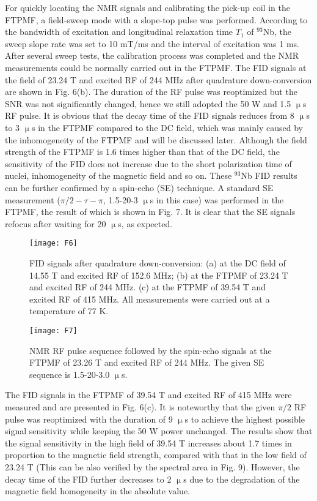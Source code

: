 \documentclass[lettersize,journal]{IEEEtran}
\begin{document}
For quickly locating the NMR signals and calibrating the pick-up coil in the FTPMF, a field-sweep mode with a slope-top pulse was performed. According to the bandwidth of excitation and longitudinal relaxation time $T_1$ of $^{93}$Nb, the sweep slope rate was set to 10 mT/ms and the interval of excitation was 1 ms. After several sweep tests, the calibration process was completed and the NMR measurements could be normally carried out in the FTPMF. The FID signals at the field of 23.24 T and excited RF of 244 MHz after quadrature down-conversion are shown in Fig. 6(b). The duration of the RF pulse was reoptimized but the SNR was not significantly changed, hence we still adopted the 50 W and 1.5 $\upmu$s RF pulse. It is obvious that the decay time of the FID signals reduces from 8 $\upmu$s to 3 $\upmu$s in the FTPMF compared to the DC field, which was mainly caused by the inhomogeneity of the FTPMF and will be discussed later. Although the field strength of the FTPMF is 1.6 times higher than that of the DC field, the sensitivity of the FID does not increase due to the short polarization time of nuclei, inhomogeneity of the magnetic field and so on. These $^{93}$Nb FID results can be further confirmed by a spin-echo (SE) technique. A standard SE measurement ($\pi /2-\tau -\pi$, 1.5-20-3 $\upmu$s in this case) was performed in the FTPMF, the result of which is shown in Fig. 7. It is clear that the SE signals refocus after waiting for 20 $\upmu$s, as expected.

\begin{figure}[t]
\centering
\texttt{[image: F6]}
\caption{FID signals after quadrature down-conversion: (a) at the DC field of 14.55 T and excited RF of 152.6 MHz; (b) at the FTPMF of 23.24 T and excited RF of 244 MHz. (c) at the FTPMF of 39.54 T and excited RF of 415 MHz. All measurements were carried out at a temperature of 77 K.}
\end{figure}

\begin{figure}[t]
\centering
\texttt{[image: F7]}
\caption{
NMR RF pulse sequence followed by the spin-echo signals at the FTPMF of 23.26 T and excited RF of 244 MHz. The given SE sequence is 1.5-20-3.0 $\upmu$s. %
}
\end{figure}

The FID signals in the FTPMF of 39.54 T and excited RF of 415 MHz were measured and are presented in Fig. 6(c). It is noteworthy that the given $\pi/2$ RF pulse was reoptimized with the duration of 9 $\upmu$s to achieve the highest possible signal sensitivity while keeping the 50 W power unchanged. The results show that the signal sensitivity in the high field of 39.54 T increases about 1.7 times in proportion to the magnetic field strength, compared with that in the low field of 23.24 T (This can be also verified by the spectral area in Fig. 9). However, the decay time of the FID further decreases to 2 $\upmu$s due to the degradation of the magnetic field homogeneity in the absolute value.
\end{document}
